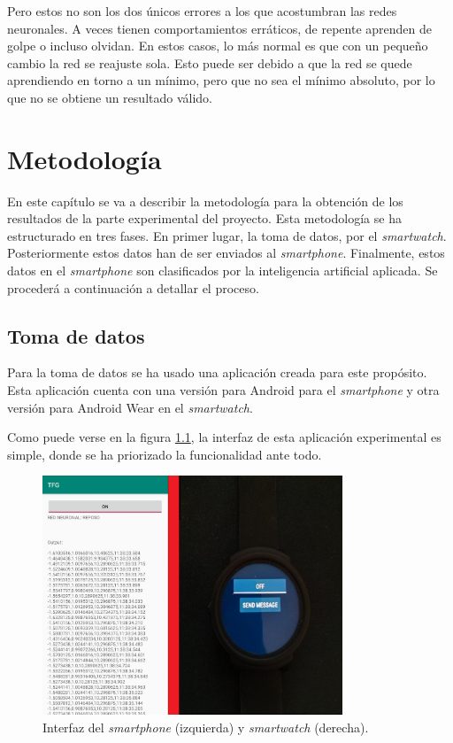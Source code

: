\documentclass[12pt]{book}
\numberwithin{equation}{section}
\begin{document}
Pero estos no son los dos únicos errores a los que acostumbran las redes neuronales. A veces tienen comportamientos erráticos, de repente aprenden de golpe o incluso olvidan. En estos casos, lo más normal es que con un pequeño cambio la red se reajuste sola. Esto puede ser debido a que la red se quede aprendiendo en torno a un mínimo, pero que no sea el mínimo absoluto, por lo que no se obtiene un resultado válido.


\chapter{Metodología}
En este capítulo se va a describir la metodología para la obtención de los resultados de la parte experimental del proyecto. Esta metodología se ha estructurado en tres fases. En primer lugar, la toma de datos, por el \textit{smartwatch}. Posteriormente estos datos han de ser enviados al \textit{smartphone}. Finalmente, estos datos en el \textit{smartphone} son clasificados por la inteligencia artificial aplicada. Se procederá a continuación a detallar el proceso.

\section{Toma de datos}

Para la toma de datos se ha usado una aplicación creada para este propósito. Esta aplicación cuenta con una versión para Android para el \textit{smartphone} y otra versión para Android Wear en el \textit{smartwatch}.

Como puede verse en la figura \ref{fig:mesh2}, la interfaz de esta aplicación experimental es simple, donde se ha priorizado la funcionalidad ante todo.

\begin{figure}[h]
    \centering
    \includegraphics[width=0.8\textwidth]{Interfaces.jpg}
    \caption{Interfaz del \textit{smartphone} (izquierda) y \textit{smartwatch} (derecha).}
    \label{fig:mesh2}
\end{figure}
\end{document}
